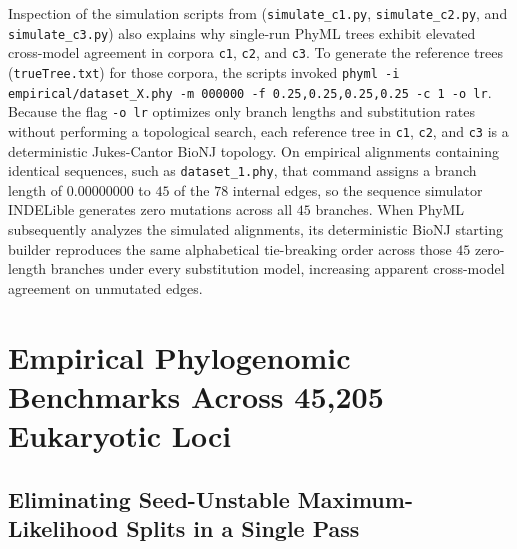 \documentclass[11pt,a4paper]{article}
\begin{document}
Inspection of the simulation scripts from \citet{abadi2019model} (\texttt{simulate\_c1.py}, \texttt{simulate\_c2.py}, and \texttt{simulate\_c3.py}) also explains why single-run PhyML trees exhibit elevated cross-model agreement in corpora \texttt{c1}, \texttt{c2}, and \texttt{c3}. To generate the reference trees (\texttt{trueTree.txt}) for those corpora, the scripts invoked \texttt{phyml -i empirical/dataset\_X.phy -m 000000 -f 0.25,0.25,0.25,0.25 -c 1 -o lr}. Because the flag \texttt{-o lr} optimizes only branch lengths and substitution rates without performing a topological search, each reference tree in \texttt{c1}, \texttt{c2}, and \texttt{c3} is a deterministic Jukes-Cantor BioNJ topology. On empirical alignments containing identical sequences, such as \texttt{dataset\_1.phy}, that command assigns a branch length of $0.00000000$ to $45$ of the $78$ internal edges, so the sequence simulator INDELible generates zero mutations across all $45$ branches. When PhyML subsequently analyzes the simulated alignments, its deterministic BioNJ starting builder reproduces the same alphabetical tie-breaking order across those $45$ zero-length branches under every substitution model, increasing apparent cross-model agreement on unmutated edges.

\section{Empirical Phylogenomic Benchmarks Across 45,205 Eukaryotic Loci}

\subsection{Eliminating Seed-Unstable Maximum-Likelihood Splits in a Single Pass}
\end{document}

